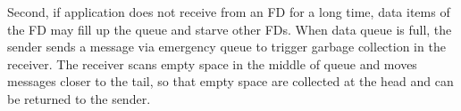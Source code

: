 Second, if application does not receive from an FD for a long time, data items of the FD may fill up the queue and starve other FDs.
When data queue is full, the sender sends a message via emergency queue to trigger garbage collection in the receiver.
The receiver scans empty space in the middle of queue and moves messages closer to the tail, so that empty space are collected at the head and can be returned to the sender.


